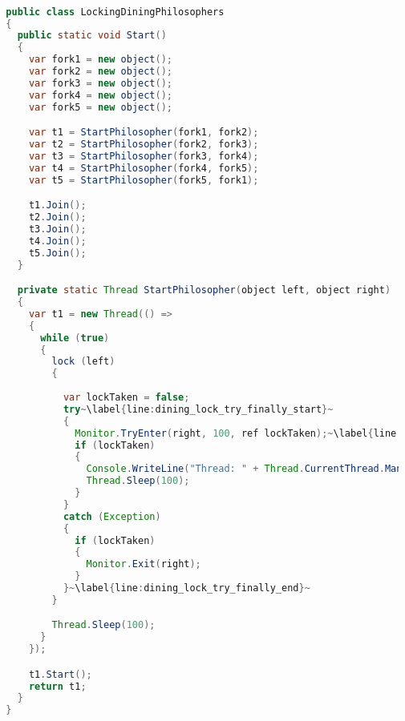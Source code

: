 \begin{lstlisting}[label=lst:impl_dining_lock,
  caption={Lock Based Dining Philosophers Implementation},
  language=Java,  
  showspaces=false,
  showtabs=false,
  breaklines=true,
  showstringspaces=false,
  breakatwhitespace=true,
  commentstyle=\color{greencomments},
  keywordstyle=\color{bluekeywords},
  stringstyle=\color{redstrings},
  escapechar=~,
  morekeywords={atomic, retry, orelse, var, get, set, ref, out, readonly, virtual, override, lock}]  % Start your code-block

  public class LockingDiningPhilosophers
  {
  	public static void Start()
  	{
      var fork1 = new object();
      var fork2 = new object();
      var fork3 = new object();
      var fork4 = new object();
      var fork5 = new object();

      var t1 = StartPhilosopher(fork1, fork2);
      var t2 = StartPhilosopher(fork2, fork3);
      var t3 = StartPhilosopher(fork3, fork4);
      var t4 = StartPhilosopher(fork4, fork5);
      var t5 = StartPhilosopher(fork5, fork1);

      t1.Join();
      t2.Join();
      t3.Join();
      t4.Join();
      t5.Join();
    }

    private static Thread StartPhilosopher(object left, object right)
    {
      var t1 = new Thread(() =>
      {
        while (true)
        {
          lock (left)
          {
          
            var lockTaken = false;
            try~\label{line:dining_lock_try_finally_start}~
            {
              Monitor.TryEnter(right, 100, ref lockTaken);~\label{line:dining_lock_try}~
              if (lockTaken)
              {
                Console.WriteLine("Thread: " + Thread.CurrentThread.ManagedThreadId + " eating.");
                Thread.Sleep(100);
              }
            }
            catch (Exception)
            {
              if (lockTaken)
              {
                Monitor.Exit(right);
              }
            }~\label{line:dining_lock_try_finally_end}~
          }

          Thread.Sleep(100);
        }
      });

      t1.Start();
      return t1;
    }
  }
  
\end{lstlisting}

